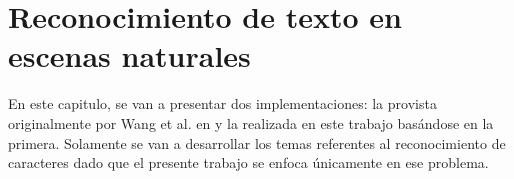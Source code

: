 \newpage	
\section{Reconocimiento de texto en escenas naturales}

	En este capitulo, se van a presentar dos implementaciones: la provista originalmente por Wang et al. en \cite{wang} y la realizada en este trabajo basándose en la primera. Solamente se van a desarrollar los temas referentes al reconocimiento de caracteres dado que el presente trabajo se enfoca únicamente en ese problema.
	
		
	
	
	
	
	
